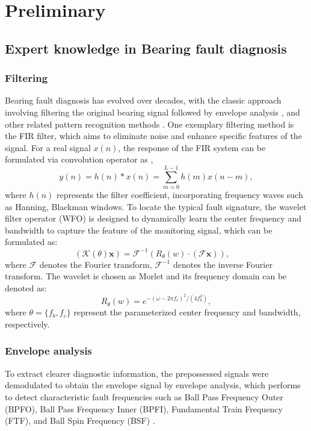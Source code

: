 \documentclass[lettersize,journal]{IEEEtran}
\begin{document}
\section{Preliminary}

\subsection{Expert knowledge in Bearing fault diagnosis}


\subsubsection{Filtering}
Bearing fault diagnosis has evolved over decades, with the classic approach involving filtering the original bearing signal followed by envelope analysis \cite{Randall2011}, and other related pattern recognition methods \cite{WORDEN20114}. One exemplary filtering method is the FIR filter, which aims to eliminate noise and enhance specific features of the signal. For a real signal $x(n)$, the response of the FIR system can be formulated via convolution operator as \cite{Rui2024},
\begin{equation}
    y(n)=h(n)*x(n)=\sum_{m=0}^{L-1}h(m)x(n-m),
\end{equation}
where $h(n)$ represents the filter coefficient, incorporating frequency waves such as Hanning, Blackman windows. To locate the typical fault signature, the wavelet filter operator (WFO) \cite{Li2024_TON} is designed to dynamically learn the center frequency and bandwidth to capture the feature of the monitoring signal, which can be formulated as:
\begin{equation}\label{eq.FO}
    \left(\mathcal{K}(\theta) \mathbf{x}\right)=\mathcal{F}^{-1}\left(R_\theta(w) \cdot\left(\mathcal{F} \mathbf{x}\right)\right), \quad 
\end{equation}
where $\mathcal{F}$ denotes the Fourier transform, $\mathcal{F}^{-1}$ denotes the inverse Fourier transform. The wavelet is chosen as Morlet and its frequency domain can be denoted as:
\begin{equation}
    R_\theta(w)=e^{-(\omega-2\pi f_c)^{2}/(4 f_b ^{2})} \label{eqfilter},
\end{equation}
where $\theta = \{f_b,f_c\}$ represent the parameterized center frequency and bandwidth, respectively.

\subsubsection{Envelope analysis}
To extract clearer diagnostic information, the prepossessed signals were demodulated to obtain the envelope signal by envelope analysis, which performs to detect characteristic fault frequencies such as Ball Pass Frequency Outer (BPFO), Ball Pass Frequency Inner (BPFI), Fundamental Train Frequency (FTF), and Ball Spin Frequency (BSF) \cite{Randall2011}. 
\end{document}
